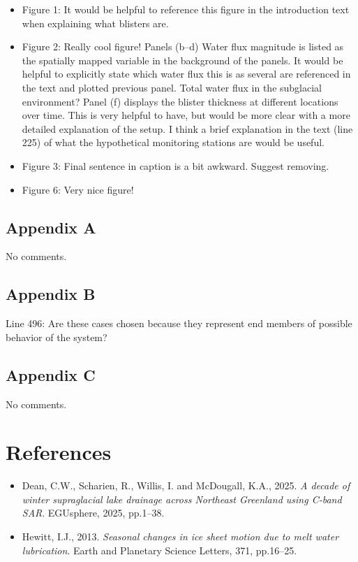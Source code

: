 \documentclass[11pt]{article}
\begin{document}
\begin{itemize}[leftmargin=*]
\item Figure 1: It would be helpful to reference this figure in the introduction text when explaining
what blisters are.

\item Figure 2: Really cool figure! Panels (b--d) Water flux magnitude is listed as the spatially mapped
variable in the background of the panels. It would be helpful to explicitly state which water flux
this is as several are referenced in the text and plotted previous panel. Total water flux in the
subglacial environment? Panel (f) displays the blister thickness at different locations over time.
This is very helpful to have, but would be more clear with a more detailed explanation of the
setup. I think a brief explanation in the text (line 225) of what the hypothetical monitoring
stations are would be useful.

\item Figure 3: Final sentence in caption is a bit awkward. Suggest removing.

\item Figure 6: Very nice figure!
\end{itemize}

\subsection*{Appendix A}

No comments.

\subsection*{Appendix B}

Line 496: Are these cases chosen because they represent end members of possible behavior of
the system?

\subsection*{Appendix C}

No comments.

\section*{References}

\begin{itemize}
\item Dean, C.W., Scharien, R., Willis, I. and McDougall, K.A., 2025. \textit{A decade of winter supraglacial
lake drainage across Northeast Greenland using C-band SAR}. EGUsphere, 2025, pp.1--38.

\item Hewitt, I.J., 2013. \textit{Seasonal changes in ice sheet motion due to melt water lubrication}.
Earth and Planetary Science Letters, 371, pp.16--25.
\end{itemize}
\end{document}
